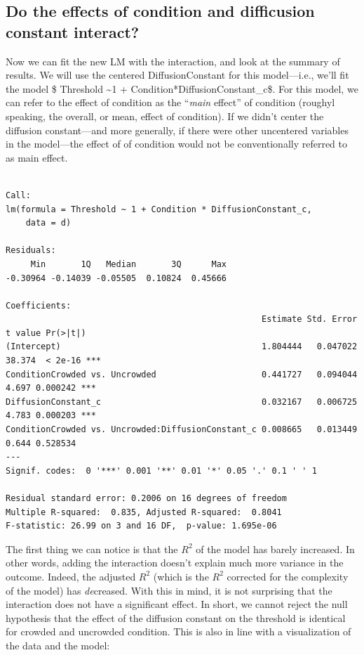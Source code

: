 \documentclass[
]{article}
\begin{document}
\normalsize

\hypertarget{do-the-effects-of-condition-and-difficusion-constant-interact}{%
\subsection{Do the effects of condition and difficusion constant
interact?}\label{do-the-effects-of-condition-and-difficusion-constant-interact}}

Now we can fit the new LM with the interaction, and look at the summary
of results. We will use the centered DiffusionConstant for this
model---i.e., we'll fit the model \$ Threshold \sim 1 +
Condition*DiffusionConstant\_c\$. For this model, we can refer to the
effect of condition as the ``\emph{main} effect'' of condition (roughyl
speaking, the overall, or mean, effect of condition). If we didn't
center the diffusion constant---and more generally, if there were other
uncentered variables in the model---the effect of of condition would not
be conventionally referred to as main effect.

\footnotesize

\begin{verbatim}

Call:
lm(formula = Threshold ~ 1 + Condition * DiffusionConstant_c, 
    data = d)

Residuals:
     Min       1Q   Median       3Q      Max 
-0.30964 -0.14039 -0.05505  0.10824  0.45666 

Coefficients:
                                                   Estimate Std. Error t value Pr(>|t|)    
(Intercept)                                        1.804444   0.047022  38.374  < 2e-16 ***
ConditionCrowded vs. Uncrowded                     0.441727   0.094044   4.697 0.000242 ***
DiffusionConstant_c                                0.032167   0.006725   4.783 0.000203 ***
ConditionCrowded vs. Uncrowded:DiffusionConstant_c 0.008665   0.013449   0.644 0.528534    
---
Signif. codes:  0 '***' 0.001 '**' 0.01 '*' 0.05 '.' 0.1 ' ' 1

Residual standard error: 0.2006 on 16 degrees of freedom
Multiple R-squared:  0.835, Adjusted R-squared:  0.8041 
F-statistic: 26.99 on 3 and 16 DF,  p-value: 1.695e-06
\end{verbatim}

\normalsize

The first thing we can notice is that the \(R^2\) of the model has
barely increased. In other words, adding the interaction doesn't explain
much more variance in the outcome. Indeed, the adjusted \(R^2\) (which
is the \(R^2\) corrected for the complexity of the model) has
\emph{de}creased. With this in mind, it is not surprising that the
interaction does not have a significant effect. In short, we cannot
reject the null hypothesis that the effect of the diffusion constant on
the threshold is identical for crowded and uncrowded condition. This is
also in line with a visualization of the data and the model:
\end{document}
